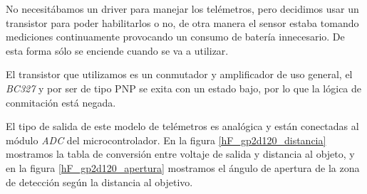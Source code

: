 No necesit\'abamos un driver para manejar los tel\'emetros, pero decidimos usar un transistor para poder habilitarlos o no,
de otra manera el sensor estaba tomando mediciones continuamente provocando un consumo de bater\'ia innecesario.
De esta forma s\'olo se enciende cuando se va a utilizar.

El transistor que utilizamos es un conmutador y amplificador de uso general, el \emph{BC327} y por ser de tipo PNP se
exita con un estado bajo, por lo que la l\'ogica de conmitaci\'on est\'a negada.

El tipo de salida de este modelo de tel\'emetros es anal\'ogica y est\'an conectadas al m\'odulo \emph{ADC} del microcontrolador.
En la figura \ref{hF_gp2d120_distancia} mostramos la tabla de conversi\'on entre voltaje de salida y distancia al objeto, y en la figura
\ref{hF_gp2d120_apertura} mostramos el \'angulo de apertura de la zona de detecci\'on seg\'un la distancia al objetivo.

